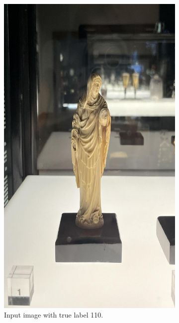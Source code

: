 \begin{figure}[h]
    \begin{subfigure}[b]{0.4\textwidth}
        \centering
        \includegraphics[width=\textwidth]{img/110.jpg}
        \caption{Input image with true label 110.}
    \end{subfigure}
    \hfill
    \begin{subfigure}[b]{0.4\textwidth}
        \centering

\end{subfigure}
\end{figure}
